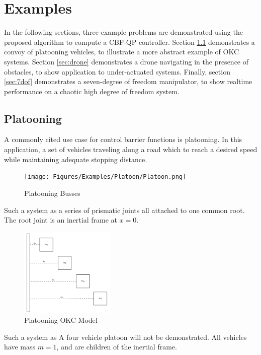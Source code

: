 \chapter{Examples}

In the following sections, three example problems are demonstrated using the proposed algorithm to compute a CBF-QP controller. Section \ref{sec:platooning} demonstrates a convoy of platooning vehicles, to illustrate a more abstract example of OKC systems. Section \ref{sec:drone} demonstrates a drone navigating in the presence of obstacles, to show application to under-actuated systems. Finally, section \ref{sec:7dof} demonstrates a seven-degree of freedom manipulator, to show realtime performance on a chaotic high degree of freedom system.



\section{Platooning} \label{sec:platooning}
\noindent A commonly cited use case for control barrier functions is platooning. In this application, a set of vehicles traveling along a road which to reach a desired speed while maintaining adequate stopping distance. 
\begin{figure}[H]
    \centering
    \texttt{[image: Figures/Examples/Platoon/Platoon.png]}
    \caption{Platooning Busses}
    \label{fig:platoon_diag}
\end{figure}
\noindent Such a system as a series of prismatic joints all attached to one common root. The root joint is an inertial frame at $x=0$.  

\begin{figure}[H]
    \centering
    \includegraphics[width=0.4\textwidth]{Figures/Examples/Platoon/PlatoonNE.png}
    \caption{Platooning OKC Model}
    \label{fig:platoon_diag_2}
\end{figure}
\noindent Such a system as
\noindent A four vehicle platoon will not be demonstrated. All vehicles have mass $m = 1$, and are children of the inertial frame. 
